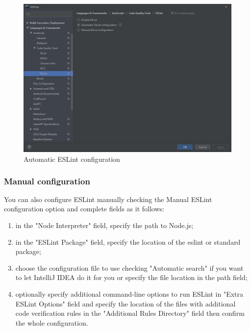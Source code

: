 \begin{figure}[H]
		\centering
		\includegraphics[scale=0.60]{../Developer_manual/img/automatic_eslint_configuration.JPG}
		\caption{Automatic ESLint configuration}
	\end{figure}	

		\subsubsection{Manual configuration}
You can also configure ESLint manually checking the Manual ESLint configuration option and complete fields as it follows:
		\begin{enumerate}
			\item in the "Node Interpreter" field, specify the path to Node.js;
			\item in the "ESLint Package" field, specify the location of the eslint or standard package;
			\item choose the configuration file to use checking "Automatic search" if you want to let IntelliJ IDEA do it for you or specify the file location in the path field;
			\item optionally specify additional command-line options to run ESLint in "Extra ESLint Options" field and specify the location of the files with additional code verification rules in the "Additional Rules Directory" field then confirm the whole configuration.
		\end{enumerate}
		

